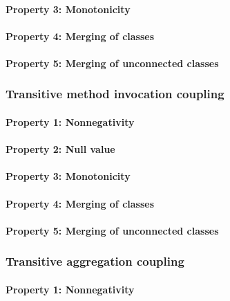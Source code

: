 \paragraph{Property 3: Monotonicity}

\paragraph{Property 4: Merging of classes}

\paragraph{Property 5: Merging of unconnected classes}

\subsubsection{Transitive method invocation coupling}
\paragraph{Property 1: Nonnegativity}

\paragraph{Property 2: Null value}

\paragraph{Property 3: Monotonicity}

\paragraph{Property 4: Merging of classes}

\paragraph{Property 5: Merging of unconnected classes}

\subsubsection{Transitive aggregation coupling}
\paragraph{Property 1: Nonnegativity}

